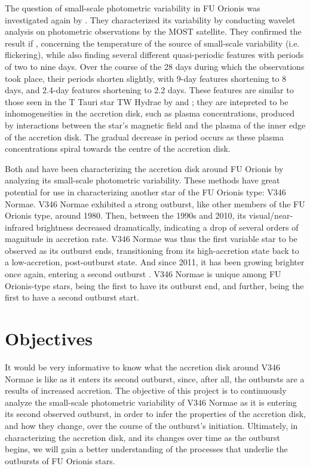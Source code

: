 \documentclass[iop,apj,tighten]{emulateapj}
\begin{document}
The question of small-scale photometric variability in FU Orionis was investigated again by \cite{siwak_photometric_2013}. They characterized its variability by conducting wavelet analysis on photometric observations by the MOST satellite. They confirmed the result if \cite{kenyon_flickering_2000}, concerning the temperature of the source of small-scale variability (i.e. flickering), while also finding several different quasi-periodic features with periods of two to nine days. Over the course of the 28 days during which the observations took place, their periods shorten slightly, with 9-day features shortening to 8 days, and 2.4-day features shortening to 2.2 days. These features are similar to those seen in the T Tauri star TW Hydrae by \cite{rucinski_photometric_2008} and \cite{siwak_analysis_2011}; they are intepreted to be inhomogeneities in the accretion disk, such as plasma concentrations, produced by interactions between the star's magnetic field and the plasma of the inner edge of the accretion disk. The gradual decrease in period occurs as these plasma concentrations spiral towards the centre of the accretion disk.

Both \cite{kenyon_flickering_2000} and \cite{siwak_photometric_2013} have been characterizing the accretion disk around FU Orionis by analyzing its small-scale photometric variability. These methods have great potential for use in characterizing another star of the FU Orionis type: V346 Normae. V346 Normae exhibited a strong outburst, like other members of the FU Orionis type, around 1980. Then, between the 1990s and 2010, its visual/near-infrared brightness decreased dramatically, indicating a drop of several orders of magnitude in accretion rate. V346 Normae was thus the first variable star to be observed as its outburst ends, transitioning from its high-accretion state back to a low-accretion, post-outburst state. And since 2011, it has been growing brighter once again, entering a second outburst \citep{kraus_v346_2016}. V346 Normae is unique among FU Orionis-type stars, being the first to have its outburst end, and further, being the first to have a second outburst start. 

\section{Objectives}
It would be very informative to know what the accretion disk around V346 Normae is like as it enters its second outburst, since, after all, the outbursts are a results of increased accretion. The objective of this project is to continuously analyze the small-scale photometric variability of V346 Normae as it is entering its second observed outburst, in order to infer the properties of the accretion disk, and how they change, over the course of the outburst's initiation. Ultimately, in characterizing the accretion disk, and its changes over time as the outburst begins, we will gain a better understanding of the processes that underlie the outbursts of FU Orionis stars.
\end{document}
